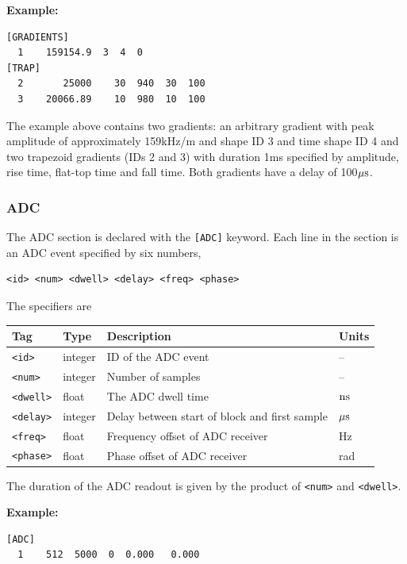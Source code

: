 \documentclass{article}
\begin{document}
\begin{minipage}{\textwidth}
\textbf{Example:}
\begin{lstlisting}
[GRADIENTS]
  1    159154.9  3  4  0
[TRAP]
  2       25000    30  940  30  100
  3    20066.89    10  980  10  100
\end{lstlisting}
\end{minipage}

The example above contains two gradients: an arbitrary gradient with peak amplitude of approximately 159kHz/m and shape ID 3 and time shape ID 4 and two trapezoid gradients (IDs 2 and 3) with duration 1ms specified by amplitude, rise time, flat-top time and fall time.
Both gradients have a delay of 100$\rm \mu s$.

\subsubsection{ADC}
The ADC section is declared with the \verb.[ADC]. keyword. Each line in the section is an ADC event specified by six numbers,
\begin{lstlisting}
<id> <num> <dwell> <delay> <freq> <phase>
\end{lstlisting}

The specifiers are

\begin{tabularx}{\textwidth}{llXl}
\toprule
Tag & Type & Description & Units\\
\midrule
\verb.<id>. & integer & ID of the ADC event & -- \\
\verb.<num>. & integer & Number of samples & -- \\
\verb.<dwell>. & float & The ADC dwell time & $\rm n s$ \\
\verb.<delay>. & integer & Delay between start of block and first sample & $\rm \mu s$  \\
\verb.<freq>. & float & Frequency offset of ADC receiver & Hz \\
\verb.<phase>. & float & Phase offset of ADC receiver & rad \\
\bottomrule
\end{tabularx}

The duration of the ADC readout is given by the product of \verb.<num>. and \verb.<dwell>..

\begin{minipage}{\textwidth}
\textbf{Example:}
\begin{lstlisting}
[ADC]
  1    512  5000  0  0.000   0.000
\end{lstlisting}
\end{minipage}
\end{document}
